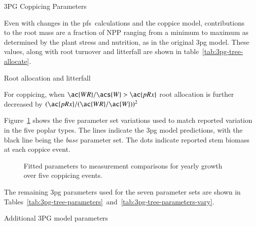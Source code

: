 \documentclass[preprint,review,12pt]{elsarticle}
\begin{document}
\begin{table}%
\caption{3PG Coppicing Parameters}

\label{tab:3pg-tree-coppice}
 \end{table}

 Even with changes in the \ac{pfs}~calculations and the coppice model,
 contributions to the root mass are a fraction of \ac{NPP} ranging
 from a minimum to maximum as determined by the plant stress and
 nutrition, as in the original \ac{3pg} model.  These values, along
 with root turnover and litterfall are shown in
 table~\ref{tab:3pg-tree-allocate}.  

\begin{table}%
\caption{Root allocation and litterfall}

  \begin{flushleft}For coppicing, when $\ac{WR}/\acs{W}>\ac{pRx}$ root allocation is further 
decreased by $(\ac{pRx}/(\ac{WR}/\ac{W}))^2$
\end{flushleft}  
\label{tab:3pg-tree-allocate}
\end{table}

Figure~\ref{fig:pont-best} shows the five parameter set variations
used to match reported variation in the five poplar types.  The lines
indicate the \ac{3pg} model predictions, with the black line being the
\emph{base} parameter set.  The dots indicate reported stem biomass at
each coppice event.

\begin{figure}%
  \centering
  
  \caption{Fitted parameters to measurement comparisons for yearly growth
      over five coppicing events.}
\label{fig:pont-best}
\end{figure}

The remaining \ac{3pg} parameters used for the seven parameter sets are shown in 
Tables~\ref{tab:3pg-tree-parameters}~and~\ref{tab:3pg-tree-parameters-vary}. 

\begin{table}%
\caption{Additional 3PG model parameters}

\label{tab:3pg-tree-parameters}
 \end{table}
\end{document}

